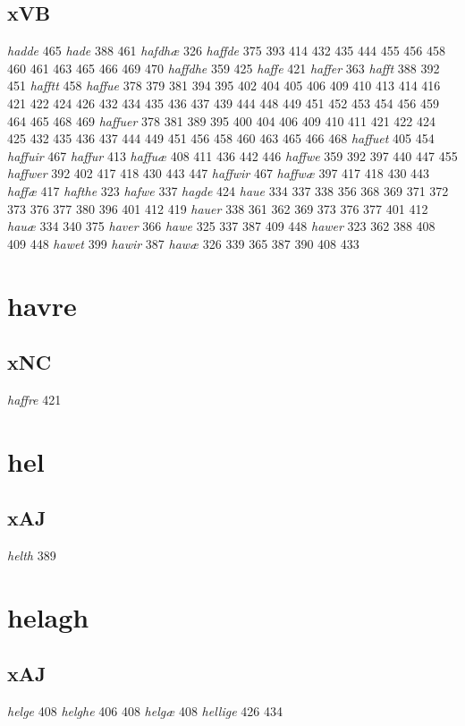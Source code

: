 \documentclass[a4paper,twocolumn]{article}
\begin{document}
\subsection{xVB}
\label{sec:org0d1104b}
\emph{hadde} 465 \emph{hade} 388 461 \emph{hafdhæ} 326 \emph{haffde} 375 393 414 432 435 444 455 456 458 460 461 463 465 466 469 470 \emph{haffdhe} 359 425 \emph{haffe} 421 \emph{haffer} 363 \emph{hafft} 388 392 451 \emph{hafftt} 458 \emph{haffue} 378 379 381 394 395 402 404 405 406 409 410 413 414 416 421 422 424 426 432 434 435 436 437 439 444 448 449 451 452 453 454 456 459 464 465 468 469 \emph{haffuer} 378 381 389 395 400 404 406 409 410 411 421 422 424 425 432 435 436 437 444 449 451 456 458 460 463 465 466 468 \emph{haffuet} 405 454 \emph{haffuir} 467 \emph{haffur} 413 \emph{haffuæ} 408 411 436 442 446 \emph{haffwe} 359 392 397 440 447 455 \emph{haffwer} 392 402 417 418 430 443 447 \emph{haffwir} 467 \emph{haffwæ} 397 417 418 430 443 \emph{haffæ} 417 \emph{hafthe} 323 \emph{hafwe} 337 \emph{hagde} 424 \emph{haue} 334 337 338 356 368 369 371 372 373 376 377 380 396 401 412 419 \emph{hauer} 338 361 362 369 373 376 377 401 412 \emph{hauæ} 334 340 375 \emph{haver} 366 \emph{hawe} 325 337 387 409 448 \emph{hawer} 323 362 388 408 409 448 \emph{hawet} 399 \emph{hawir} 387 \emph{hawæ} 326 339 365 387 390 408 433 
\section{havre}
\label{sec:orgda0466e}
\subsection{xNC}
\label{sec:org45bce1b}
\emph{haffre} 421 
\section{hel}
\label{sec:org46fe680}
\subsection{xAJ}
\label{sec:orgae2e97d}
\emph{helth} 389 
\section{helagh}
\label{sec:org7180912}
\subsection{xAJ}
\label{sec:org0a34b77}
\emph{helge} 408 \emph{helghe} 406 408 \emph{helgæ} 408 \emph{hellige} 426 434 
\end{document}
